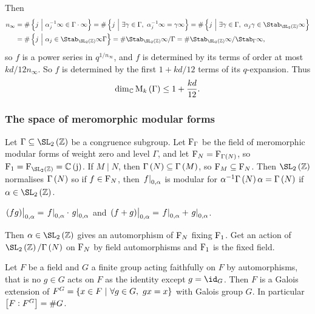 Then
\begin{align*}
n_\infty
& = \#\cbr{j \st \alpha_j^{-1}\infty \in \Gamma \cdot \infty}
= \#\cbr{j \st \exists \gamma \in \Gamma, \ \alpha_j^{-1}\infty
= \gamma\infty} = \#\cbr{j \st \exists \gamma \in \Gamma, \ \alpha_j\gamma \in \Stab_{\SL_2\br{\ZZ}} \infty} \\
& = \#\cbr{j \st \alpha_j \in \Stab_{\SL_2\br{\ZZ}} \infty\Gamma}
= \#\Stab_{\SL_2\br{\ZZ}} \infty / \Gamma
= \#\Stab_{\SL_2\br{\ZZ}} \infty / \Stab_\Gamma \infty,
\end{align*}
so $ f $ is a power series in $ q^{1 / n_\infty} $, and $ f $ is determined by its terms of order at most $ kd / 12n_\infty $. So $ f $ is determined by the first $ 1 + kd / 12 $ terms of its $ q $-expansion. Thus
$$ \dim_\CC \M_k\br{\Gamma} \le 1 + \dfrac{kd}{12}. $$

\pagebreak

\subsubsection{The space of meromorphic modular forms}


Let $ \Gamma \subseteq \SL_2\br{\ZZ} $ be a congruence subgroup. Let $ \mathrm{F}_\Gamma $ be the field of meromorphic modular forms of weight zero and level $ \Gamma $, and let $ \F_N = \F_{\Gamma\br{N}} $, so $ \F_1 = \F_{\SL_2\br{\ZZ}} = \CC\br{\j} $. If $ M \mid N $, then $ \Gamma\br{N} \subseteq \Gamma\br{M} $, so $ \mathrm{F}_M \subseteq \mathrm{F}_N $. Then $ \SL_2\br{\ZZ} $ normalises $ \Gamma\br{N} $ so if $ f \in \mathrm{F}_N $, then $ \left. f \right|_{0, \alpha} $ is modular for $ \alpha^{-1}\Gamma\br{N}\alpha = \Gamma\br{N} $ if $ \alpha \in \SL_2\br{\ZZ} $.

\begin{note*}
$ \eval{\br{fg}}_{0, \alpha} = \eval{f}_{0, \alpha} \cdot \eval{g}_{0, \alpha} $ and $ \eval{\br{f + g}}_{0, \alpha} = \eval{f}_{0, \alpha} + \eval{g}_{0, \alpha} $.
\end{note*}

Then $ \alpha \in \SL_2\br{\ZZ} $ gives an automorphism of $ \mathrm{F}_N $ fixing $ \mathrm{F}_1 $. Get an action of $ \SL_2\br{\ZZ} / \Gamma\br{N} $ on $ \mathrm{F}_N $ by field automorphisms and $ \mathrm{F}_1 $ is the fixed field.

\begin{theorem}
Let $ F $ be a field and $ G $ a finite group acting faithfully on $ F $ by automorphisms, that is no $ g \in G $ acts on $ F $ as the identity except $ g = \id_G $. Then $ F $ is a Galois extension of $ F^G = \cbr{x \in F \st \forall g \in G, \ gx = x} $ with Galois group $ G $. In particular $ \sbr{F : F^G} = \#G $.
\end{theorem}

